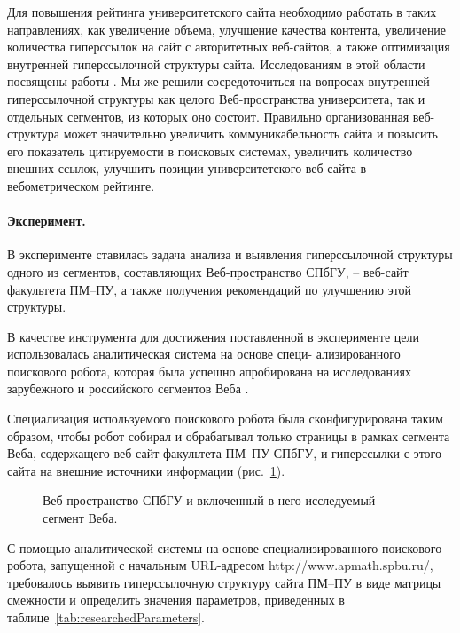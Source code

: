 Для повышения рейтинга университетского сайта необходимо работать в таких направлениях, как увеличение объема, улучшение качества контента, увеличение количества гиперссылок на сайт с авторитетных веб-сайтов, а также оптимизация внутренней гиперссылочной структуры сайта. Исследованиям в этой области посвящены работы \cite{HolmbergThelwall,Pechnikov,Pechnikov2,PechnikovChirkovChuiko,BlekanovSergeevPechnikov,BlekanovSergeevMaksimov,BlekanovSergeev}. Мы же решили сосредоточиться на вопросах внутренней гиперссылочной структуры как целого Веб-пространства университета, так и отдельных сегментов, из которых оно состоит. Правильно организованная веб-структура может значительно увеличить коммуникабельность сайта и повысить его показатель цитируемости в поисковых системах, увеличить количество внешних ссылок, улучшить позиции университетского веб-сайта в вебометрическом рейтинге.

\paragraph{Эксперимент.} В эксперименте ставилась задача анализа и выявления гиперссылочной структуры одного из сегментов, составляющих Веб-пространство СПбГУ, -- веб-сайт факультета ПМ–ПУ, а также получения рекомендаций по улучшению этой структуры.

В качестве инструмента для достижения поставленной в эксперименте цели использовалась аналитическая система на основе специ- ализированного поискового робота, которая была успешно апробирована на исследованиях зарубежного и российского сегментов Веба \cite{BlekanovSergeevPechnikov,BlekanovSergeevMaksimov,BlekanovSergeev,BlekanovSergeevMartynenko}.

Специализация используемого поискового робота была сконфигурирована таким образом, чтобы робот собирал и обрабатывал только страницы в рамках сегмента Веба, содержащего веб-сайт факультета ПМ–ПУ СПбГУ, и гиперссылки с этого сайта на внешние источники информации (рис.~\cref{fig:spbuApmathWebSpace}).

\begin{figure}[ht]
	\caption{Веб-пространство СПбГУ и включенный в него исследуемый сегмент Веба.}\label{fig:spbuApmathWebSpace}
\end{figure}

С помощью аналитической системы на основе специализированного поискового робота, запущенной с начальным URL-адресом http://www.apmath.spbu.ru/, требовалось выявить гиперссылочную структуру сайта ПМ–ПУ в виде матрицы смежности и определить значения параметров, приведенных в таблице~\cref{tab:researchedParameters}.

